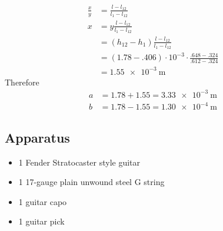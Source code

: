 \documentclass[11pt]{article}
\begin{document}
\begin{flushleft}
\begin{itemize}
\begin{align*}
                    \frac{x}{y} &= \frac{l-l_{12}}{l_1-l_{12}} \\
                    x &= y\frac{l-l_{12}}{l_1-l_{12}} \\
                    &= (h_{12}-h_1)\frac{l-l_{12}}{l_1-l_{12}} \\
                    &= (1.78-.406) \cdot 10^{-3} \cdot \frac{.648-.324}{.612-.324} \\
                    &= \SI{1.55e-3}{\meter}
                \end{align*}
                Therefore
                \begin{align*}
                    a &= 1.78 + 1.55 = \SI{3.33e-3}{\meter} \\
                    b &= 1.78 - 1.55 = \SI{1.30e-4}{\meter}
                \end{align*}    
            \end{itemize}
        \subsection{Apparatus}
            \begin{itemize}
                \item 1 Fender Stratocaster style guitar
                \item 1 17-gauge plain unwound steel G string
                \item 1 guitar capo 
                \item 1 guitar pick
            \end{itemize}

\end{flushleft}
\end{document}
